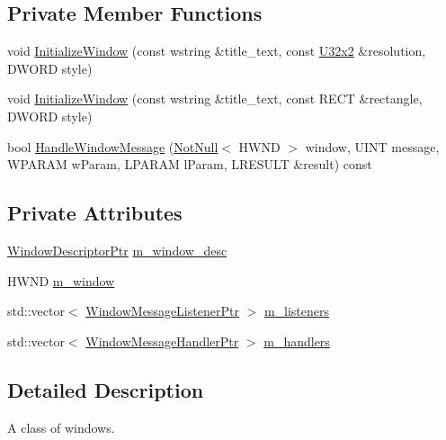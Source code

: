 \subsection*{Private Member Functions}
\begin{DoxyCompactItemize}
\item 
void \hyperlink{classmage_1_1_window_a88a4c3dceff2ef728befa5d5a11ef76c}{Initialize\+Window} (const wstring \&title\+\_\+text, const \hyperlink{namespacemage_a88e05bff0300120c013285d3dcad95c5}{U32x2} \&resolution, D\+W\+O\+RD style)
\item 
void \hyperlink{classmage_1_1_window_a1b2face21d9235cbf298e4e6e34186b7}{Initialize\+Window} (const wstring \&title\+\_\+text, const R\+E\+CT \&rectangle, D\+W\+O\+RD style)
\item 
bool \hyperlink{classmage_1_1_window_a4f658dd2b4be552e2b226b7b8f3c2ccd}{Handle\+Window\+Message} (\hyperlink{namespacemage_a8769f9d670d6b585ea306cb1062af94b}{Not\+Null}$<$ H\+W\+ND $>$ window, U\+I\+NT message, W\+P\+A\+R\+AM w\+Param, L\+P\+A\+R\+AM l\+Param, L\+R\+E\+S\+U\+LT \&result) const
\end{DoxyCompactItemize}
\subsection*{Private Attributes}
\begin{DoxyCompactItemize}
\item 
\hyperlink{classmage_1_1_window_ac41b052d8e8dd0571b3ec862e8f6da05}{Window\+Descriptor\+Ptr} \hyperlink{classmage_1_1_window_a51bbea46f4590a68d384d0b8d14e0cd8}{m\+\_\+window\+\_\+desc}
\item 
H\+W\+ND \hyperlink{classmage_1_1_window_a5ca72a18801ff9e6abc309949d7b08b4}{m\+\_\+window}
\item 
std\+::vector$<$ \hyperlink{classmage_1_1_window_a0e0a4f2a3f6db176f6aec454b94a06fb}{Window\+Message\+Listener\+Ptr} $>$ \hyperlink{classmage_1_1_window_a28aab68439dc39058a7e507b0cd8c60b}{m\+\_\+listeners}
\item 
std\+::vector$<$ \hyperlink{classmage_1_1_window_add1d792fb9f71e70d4fb07409d80cfdd}{Window\+Message\+Handler\+Ptr} $>$ \hyperlink{classmage_1_1_window_a7438964a7b8c196d84da24cf789e5bd9}{m\+\_\+handlers}
\end{DoxyCompactItemize}


\subsection{Detailed Description}
A class of windows. 

